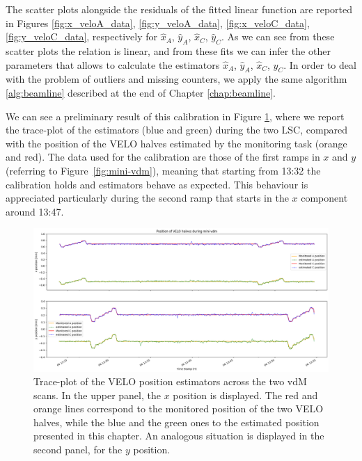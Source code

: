 The scatter plots alongside the residuals of the fitted linear function are reported in Figures \ref{fig:x_veloA_data}, \ref{fig:y_veloA_data}, \ref{fig:x_veloC_data}, \ref{fig:y_veloC_data}, respectively for $\hat{x}_A$, $\hat{y}_A$, $\hat{x}_C$, $\hat{y}_C$. As we can see from these scatter plots the relation is linear, and from these fits we can infer the other parameters that allows to calculate the estimators $\hat{x}_A$, $\hat{y}_A$, $\hat{x}_C$, $\hat{y}_C$. In order to deal with the problem of outliers and missing counters, we apply the same algorithm \ref{alg:beamline} described at the end of Chapter \ref{chap:beamline}. 

We can see a preliminary result of this calibration in Figure \ref{fig:traceplot_xy}, where we report the trace-plot of the estimators (blue and green) during the two LSC, compared with the position of the VELO halves estimated by the monitoring task (orange and red). The data used for the calibration are those of the first ramps in $x$ and $y$ (referring to Figure~\ref{fig:mini-vdm}), meaning that starting from 13:32 the calibration holds and estimators behave as expected. This behaviour is appreciated particularly during the second ramp that starts in the $x$ component around 13:47.

\begin{figure}
    \centering
    \includegraphics[width=\textwidth]{figures/traceplot_xy.png}
    \caption{Trace-plot of the VELO position estimators across the two vdM scans. In the upper panel, the $x$ position is displayed. The red and orange lines correspond to the monitored position of the two VELO halves, while the blue and the green ones to the estimated position presented in this chapter. An analogous situation is displayed in the second panel, for the $y$ position.}
    \label{fig:traceplot_xy}
\end{figure}

